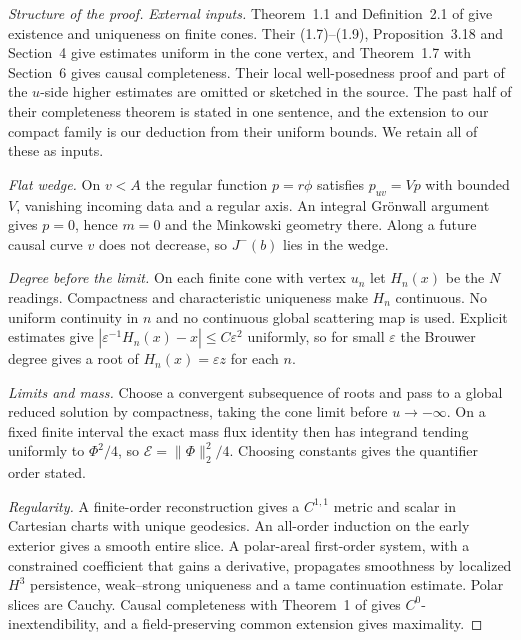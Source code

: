 \documentclass[11pt]{article}
\theoremstyle{definition}
\newcommand{\Jm}{J^{-}}
\begin{document}
\begin{proof}[Structure of the proof]
\emph{External inputs.} Theorem~1.1 and Definition~2.1 of \citet{LOY2016} give existence and
uniqueness on finite cones. Their (1.7)--(1.9), Proposition~3.18 and Section~4 give estimates
uniform in the cone vertex, and Theorem~1.7 with Section~6 gives causal completeness. Their local
well-posedness proof and part of the $u$-side higher estimates are omitted or sketched in the
source. The past half of their completeness theorem is stated in one sentence, and the extension to our compact family is our deduction from their uniform bounds. We retain all of these as inputs.

\emph{Flat wedge.} On $v<A$ the regular function $p=r\phi$ satisfies $p_{uv}=Vp$ with bounded $V$,
vanishing incoming data and a regular axis. An integral Grönwall argument gives $p=0$, hence
$m=0$ and the Minkowski geometry there. Along a future causal curve $v$ does not decrease, so
$\Jm(b)$ lies in the wedge.

\emph{Degree before the limit.} On each finite cone with vertex $u_n$ let $H_n(x)$ be the $N$
readings. Compactness and characteristic uniqueness make $H_n$ continuous. No uniform continuity in
$n$ and no continuous global scattering map is used. Explicit estimates give
$|\varepsilon^{-1}H_n(x)-x|\le C\varepsilon^2$ uniformly, so for small $\varepsilon$ the Brouwer degree
gives a root of $H_n(x)=\varepsilon z$ for each $n$.

\emph{Limits and mass.} Choose a convergent subsequence of roots and pass to a global reduced
solution by compactness, taking the cone limit before $u\to-\infty$. On a fixed finite interval
the exact mass flux identity then has integrand tending uniformly to $\Phi^2/4$, so
$\mathcal E=\|\Phi\|_2^2/4$. Choosing constants gives the quantifier order stated.

\emph{Regularity.} A finite-order reconstruction gives a $C^{1,1}$ metric and scalar in Cartesian
charts with unique geodesics. An all-order induction on the early exterior gives a smooth entire
slice. A polar-areal first-order system, with a constrained coefficient that gains a derivative,
propagates smoothness by localized $H^3$ persistence, weak--strong uniqueness and a tame continuation
estimate. Polar slices are Cauchy. Causal completeness with Theorem~1 of
\citet{GLS2018} gives $C^0$-inextendibility, and a field-preserving common extension
\citep{Ringstrom2009} gives maximality.
\end{proof}
\end{document}
